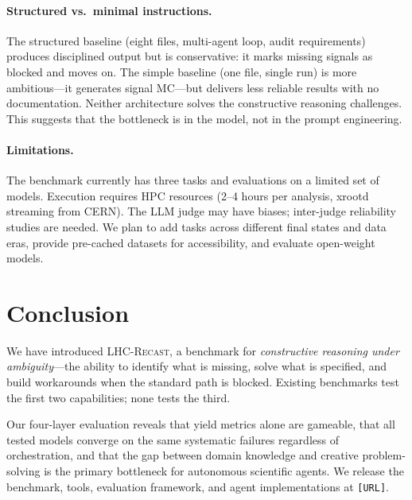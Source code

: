 \documentclass{article}
\newcommand{\toolkit}{\textsc{LHC-Recast}}
\begin{document}
\paragraph{Structured vs.\ minimal instructions.}
The structured baseline (eight files, multi-agent loop, audit requirements) produces disciplined output but is conservative: it marks missing signals as blocked and moves on.
The simple baseline (one file, single run) is more ambitious---it generates signal MC---but delivers less reliable results with no documentation.
Neither architecture solves the constructive reasoning challenges.
This suggests that the bottleneck is in the model, not in the prompt engineering.

\paragraph{Limitations.}
The benchmark currently has three tasks and evaluations on a limited set of models.
Execution requires HPC resources (2--4 hours per analysis, xrootd streaming from CERN).
The LLM judge may have biases; inter-judge reliability studies are needed.
We plan to add tasks across different final states and data eras, provide pre-cached datasets for accessibility, and evaluate open-weight models.


\section{Conclusion}
\label{sec:conclusion}

We have introduced \toolkit{}, a benchmark for \emph{constructive reasoning under ambiguity}---the ability to identify what is missing, solve what is specified, and build workarounds when the standard path is blocked.
Existing benchmarks test the first two capabilities; none tests the third.

Our four-layer evaluation reveals that yield metrics alone are gameable, that all tested models converge on the same systematic failures regardless of orchestration, and that the gap between domain knowledge and creative problem-solving is the primary bottleneck for autonomous scientific agents.
We release the benchmark, tools, evaluation framework, and agent implementations at \texttt{[URL]}.



\end{document}
